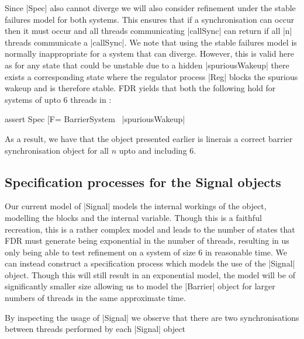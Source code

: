 Since |Spec| also cannot diverge we will also consider refinement under the stable failures model for both systems. This ensures that if a synchronisation can occur then it must occur and all threads communicating |callSync| can return if all |n| threads communicate a |callSync|.
We note that using the stable failures model is normally inappropriate for a system that can diverge. However, this is valid here as for any state that could be unstable due to a hidden |spuriousWakeup| there exists a corresponding state where the regulator process |Reg| blocks the spurious wakeup and is therefore stable. FDR yields that both the following hold for systems of upto 6 threads in :

\begin{cspm}
  assert Spec [F= BarrierSystem \ {|spuriousWakeup|}
\end{cspm}

As a result, we have that the  object presented earlier is linerais a correct barrier synchronisation object for all $n$ upto and including 6.

\subsection{Specification processes for the Signal objects}

Our current model of |Signal| models the internal workings of the object, modelling the  blocks and the internal  variable. Though this is a faithful recreation, this is a rather complex model and leads to  the number of states that FDR must generate being exponential in the number of threads, resulting in us only being able to test refinement on a system of size 6 in reasonable time. We can instead construct a specification process which models the use of the |Signal| object. Though this will still result in an exponential model, the model will be of significantly smaller size allowing us to model the |Barrier| object for larger numbers of threads in the same approximate time.

By inspecting the usage of |Signal| we observe that there are two synchronisations between threads performed by each |Signal| object 

